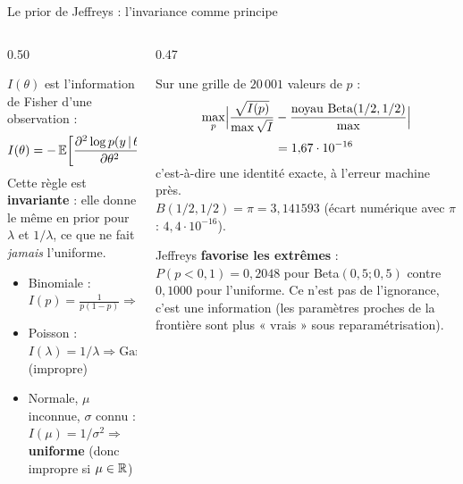 \begin{frame}{Le prior de Jeffreys : l'invariance comme principe}
\footnotesize
\begin{columns}[t]
\begin{column}{0.50\textwidth}
\begin{kbox}
$I(\theta)$ est l'information de Fisher d'une observation :
\[
I(\theta) = -\,\mathbb{E}\!\left[\frac{\partial^2 \log p(y \,\vert\, \theta)}{\partial \theta^2}\right],
\qquad p_{\text{Jeffreys}}(\theta) \propto \sqrt{\det I(\theta)}
\]
Cette règle est \textbf{invariante} : elle donne le même en prior pour $\lambda$ et
$1/\lambda$, ce que ne fait \emph{jamais} l'uniforme.
\end{kbox}
\begin{ebox}
\begin{itemize}
  \item Binomiale : $I(p) = \frac{1}{p(1-p)} \Rightarrow \mathrm{Beta}(1/2, 1/2)$
  \item Poisson : $I(\lambda) = 1/\lambda \Rightarrow \mathrm{Gamma}(1/2, 0)$ (impropre)
  \item Normale, $\mu$ inconnue, $\sigma$ connu : $I(\mu) = 1/\sigma^2 \Rightarrow$
        \textbf{uniforme} (donc impropre si $\mu \in \mathbb{R}$)
\end{itemize}
\end{ebox}
\end{column}
\begin{column}{0.47\textwidth}
\begin{solbox}
Sur une grille de $20\,001$ valeurs de $p$ :
\[
\begin{aligned}
\max_p\Bigl|\frac{\sqrt{I(p)}}{\max\sqrt{I}}
&- \frac{\text{noyau Beta}(1/2,1/2)}{\max}\Bigr|\\[1mm]
&= 1{,}67 \cdot 10^{-16}
\end{aligned}
\]
c'est-à-dire une identité exacte, à l'erreur machine près.\\
$B(1/2, 1/2) = \pi = 3{,}141593$ (écart numérique avec $\pi$ : $4{,}4 \cdot 10^{-16}$).
\end{solbox}
\begin{wbox}
Jeffreys \textbf{favorise les extrêmes} : $P(p < 0{,}1) = 0{,}2048$ pour
Beta$(0{,}5;0{,}5)$ contre $0{,}1000$ pour l'uniforme. Ce n'est pas de l'ignorance,
c'est une information (les paramètres proches de la frontière sont plus « vrais »
sous reparamétrisation).
\end{wbox}
\end{column}
\end{columns}
\end{frame}

